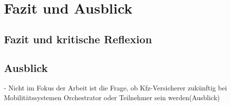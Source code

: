 \chapter{Fazit und Ausblick}

\section{Fazit und kritische Reflexion}

\newpage
\section{Ausblick}

-	Nicht im Fokus der Arbeit ist die Frage, ob Kfz-Versicherer zukünftig bei Mobilitätssystemen Orchestrator oder Teilnehmer sein werden(Ausblick)
\newpage
